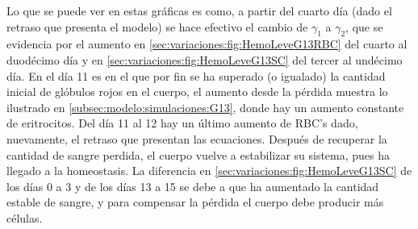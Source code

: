 Lo que se puede ver en estas gráficas es como, a partir del cuarto día (dado el retraso que presenta el modelo) se hace efectivo el cambio de $\gamma_1$ a $\gamma_2$, que se evidencia por el aumento en \ref{sec:variaciones:fig:HemoLeveG13RBC} del cuarto al duodécimo día y en \ref{sec:variaciones:fig:HemoLeveG13SC} del tercer al undécimo día. En el día 11 es en el que por fin se ha superado (o igualado) la cantidad inicial de glóbulos rojos en el cuerpo, el aumento desde la pérdida muestra lo ilustrado en \ref{subsec:modelo:simulaciones:G13}, donde hay un aumento constante de eritrocitos. Del día 11 al 12 hay un último aumento de RBC's dado, nuevamente, el retraso que presentan las ecuaciones. Después de recuperar la cantidad de sangre perdida, el cuerpo vuelve a estabilizar su sistema, pues ha llegado a la homeostasis. La diferencia en \ref{sec:variaciones:fig:HemoLeveG13SC} de los días 0 a 3 y de los días 13 a 15 se debe a que ha aumentado la cantidad estable de sangre, y para compensar la pérdida el cuerpo debe producir más células.